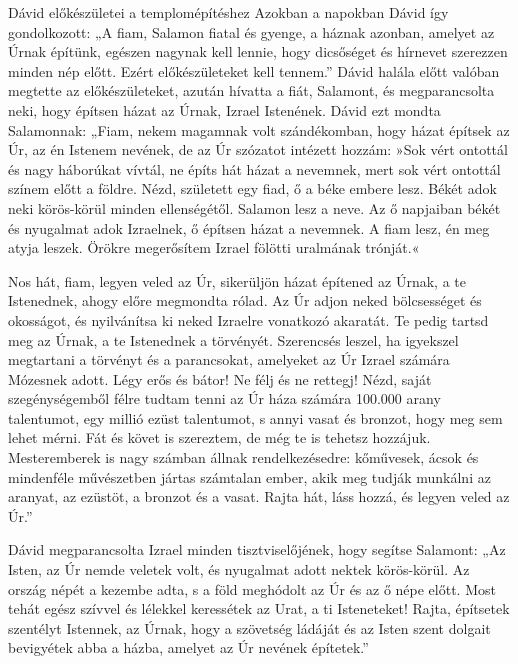 \documentclass[twoside]{article}
\begin{document}
\begin{lectio}{Dávid előkészületei a templomépítéshez}
\noindent Azokban a napokban Dávid így gondolkozott: „A fiam, Salamon fiatal és gyenge, a háznak azonban, amelyet az Úrnak építünk, egészen nagynak kell lennie, hogy dicsőséget és hírnevet szerezzen minden nép előtt. Ezért előkészületeket kell tennem.” Dávid halála előtt valóban megtette az előkészületeket, azután hívatta a fiát, Salamont, és megparancsolta neki, hogy építsen házat az Úrnak, Izrael Istenének. Dávid ezt mondta Salamonnak: „Fiam, nekem magamnak volt szándékomban, hogy házat építsek az Úr, az én Istenem nevének, de az Úr szózatot intézett hozzám: »Sok vért ontottál és nagy háborúkat vívtál, ne építs hát házat a nevemnek, mert sok vért ontottál színem előtt a földre. Nézd, született egy fiad, ő a béke embere lesz. Békét adok neki körös-körül minden ellenségétől. Salamon lesz a neve. Az ő napjaiban békét és nyugalmat adok Izraelnek, ő építsen házat a nevemnek. A fiam lesz, én meg atyja leszek. Örökre megerősítem Izrael fölötti uralmának trónját.«

Nos hát, fiam, legyen veled az Úr, sikerüljön házat építened az Úrnak, a te Istenednek, ahogy előre megmondta rólad. Az Úr adjon neked bölcsességet és okosságot, és nyilvánítsa ki neked Izraelre vonatkozó akaratát. Te pedig tartsd meg az Úrnak, a te Istenednek a törvényét. Szerencsés leszel, ha igyekszel megtartani a törvényt és a parancsokat, amelyeket az Úr Izrael számára Mózesnek adott. Légy erős és bátor! Ne félj és ne rettegj! Nézd, saját szegénységemből félre tudtam tenni az Úr háza számára 100.000 arany talentumot, egy millió ezüst talentumot, s annyi vasat és bronzot, hogy meg sem lehet mérni. Fát és követ is szereztem, de még te is tehetsz hozzájuk. Mesteremberek is nagy számban állnak rendelkezésedre: kőművesek, ácsok és mindenféle művészetben jártas számtalan ember, akik meg tudják munkálni az aranyat, az ezüstöt, a bronzot és a vasat. Rajta hát, láss hozzá, és legyen veled az Úr.”

Dávid megparancsolta Izrael minden tisztviselőjének, hogy segítse Salamont: „Az Isten, az Úr nemde veletek volt, és nyugalmat adott nektek körös-körül. Az ország népét a kezembe adta, s a föld meghódolt az Úr és az ő népe előtt. Most tehát egész szívvel és lélekkel keressétek az Urat, a ti Isteneteket! Rajta, építsetek szentélyt Istennek, az Úrnak, hogy a szövetség ládáját és az Isten szent dolgait bevigyétek abba a házba, amelyet az Úr nevének építetek.”
\end{lectio}
\end{document}
